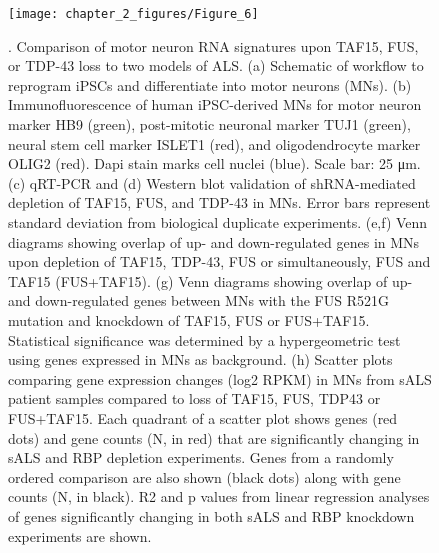 \begin{figure}[ht]
  \centering
  \texttt{[image: chapter\_2\_figures/Figure\_6]}
  \caption[Figure 6]{. Comparison of motor neuron RNA signatures upon TAF15, FUS, or TDP-43 loss to two models of ALS. (a) Schematic of workflow to reprogram iPSCs and differentiate into motor neurons (MNs). (b) Immunofluorescence of human iPSC-derived MNs for motor neuron marker HB9 (green), post-mitotic neuronal marker TUJ1 (green), neural stem cell marker ISLET1 (red), and oligodendrocyte marker OLIG2 (red). Dapi stain marks cell nuclei (blue). Scale bar: 25 μm. (c) qRT-PCR and (d) Western blot validation of shRNA-mediated depletion of TAF15, FUS, and TDP-43 in MNs. Error bars represent standard deviation from biological duplicate experiments. (e,f) Venn diagrams showing overlap of up- and down-regulated genes in MNs upon depletion of TAF15, TDP-43, FUS or simultaneously, FUS and TAF15 (FUS+TAF15). (g) Venn diagrams showing overlap of up- and down-regulated genes between MNs with the FUS R521G mutation and knockdown of TAF15, FUS or FUS+TAF15. Statistical significance was determined by a hypergeometric test using genes expressed in MNs as background. (h) Scatter plots comparing gene expression changes (log2 RPKM) in MNs from sALS patient samples compared to loss of TAF15, FUS, TDP43 or FUS+TAF15. Each quadrant of a scatter plot shows genes (red dots) and gene counts (N, in red) that are significantly changing in sALS and RBP depletion experiments. Genes from a randomly ordered comparison are also shown (black dots) along with gene counts (N, in black). R2 and p values from linear regression analyses of genes significantly changing in both sALS and RBP knockdown experiments are shown.}
  \label{fig:Figure_6}
\end{figure}

